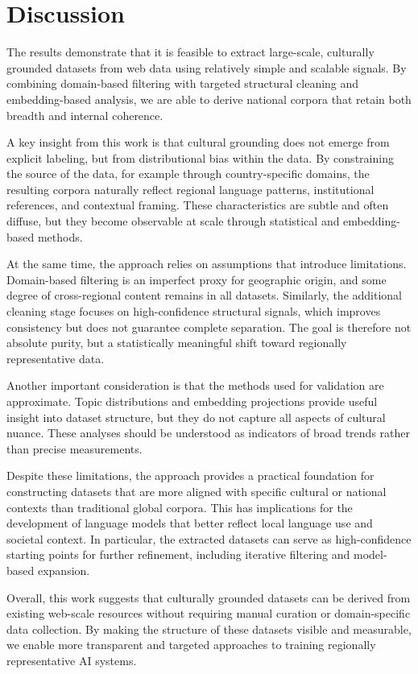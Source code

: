 \section{Discussion}

The results demonstrate that it is feasible to extract large-scale, culturally grounded datasets from web data using relatively simple and scalable signals. By combining domain-based filtering with targeted structural cleaning and embedding-based analysis, we are able to derive national corpora that retain both breadth and internal coherence.

A key insight from this work is that cultural grounding does not emerge from explicit labeling, but from distributional bias within the data. By constraining the source of the data, for example through country-specific domains, the resulting corpora naturally reflect regional language patterns, institutional references, and contextual framing. These characteristics are subtle and often diffuse, but they become observable at scale through statistical and embedding-based methods.

At the same time, the approach relies on assumptions that introduce limitations. Domain-based filtering is an imperfect proxy for geographic origin, and some degree of cross-regional content remains in all datasets. Similarly, the additional cleaning stage focuses on high-confidence structural signals, which improves consistency but does not guarantee complete separation. The goal is therefore not absolute purity, but a statistically meaningful shift toward regionally representative data.

Another important consideration is that the methods used for validation are approximate. Topic distributions and embedding projections provide useful insight into dataset structure, but they do not capture all aspects of cultural nuance. These analyses should be understood as indicators of broad trends rather than precise measurements.

Despite these limitations, the approach provides a practical foundation for constructing datasets that are more aligned with specific cultural or national contexts than traditional global corpora. This has implications for the development of language models that better reflect local language use and societal context. In particular, the extracted datasets can serve as high-confidence starting points for further refinement, including iterative filtering and model-based expansion.

Overall, this work suggests that culturally grounded datasets can be derived from existing web-scale resources without requiring manual curation or domain-specific data collection. By making the structure of these datasets visible and measurable, we enable more transparent and targeted approaches to training regionally representative AI systems.

